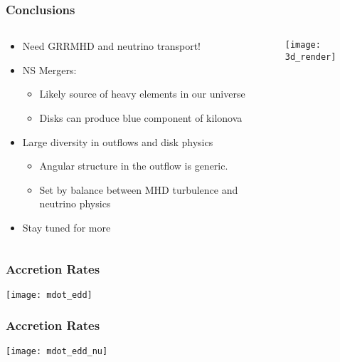 \documentclass[]{beamer}
\newcommand{\backupbegin}{
   \newcounter{finalframe}
   \setcounter{finalframe}{\value{framenumber}}
}
\begin{document}
\begin{frame}
  \frametitle{Conclusions}
  \begin{columns}
    \begin{column}{7cm}
      \begin{itemize}
      \item Need GRRMHD and neutrino transport!
      \item NS Mergers:
        \begin{itemize}
        \item Likely source of heavy elements in our
          universe
        \item Disks can produce blue component of kilonova
        \end{itemize}
      \item Large diversity in outflows and disk physics
        \begin{itemize}
        \item Angular structure in the outflow is generic.
        \item Set by balance between MHD turbulence and neutrino physics
        \end{itemize}
      \item Stay tuned for more
      \end{itemize}
    \end{column}
    \begin{column}{5cm}
      \texttt{[image: 3d\_render]}
    \end{column}
  \end{columns}
\end{frame}

\backupbegin

\begin{frame}
  \frametitle{Accretion Rates}
  \begin{center}
    \texttt{[image: mdot\_edd]}
  \end{center}
\end{frame}

\begin{frame}
  \frametitle{Accretion Rates}
  \begin{center}
    \texttt{[image: mdot\_edd\_nu]}
  \end{center}
\end{frame}
\end{document}

